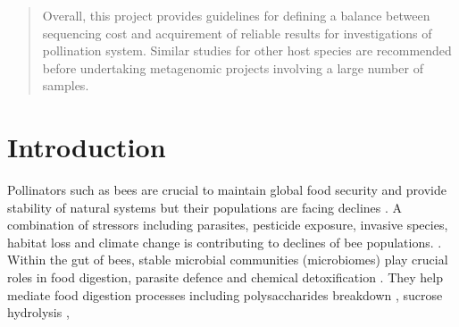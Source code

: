 \documentclass[11pt]{article}
\begin{document}
\begin{abstract}
    Overall, this project provides guidelines for defining a balance between sequencing cost and acquirement of reliable results for investigations of pollination system. 
    Similar studies for other host species are recommended before undertaking metagenomic projects involving a large number of samples.
  \end{abstract}

  \section{Introduction}
  Pollinators such as bees are crucial to maintain global food security and provide stability of natural systems \citep{hristov2020significance,bansch2021crop,khalifa2021overview} but their populations are facing declines \citep{brown2009conservation,hristov2020factors,cheng2021ecology,zattara2021worldwide}. 
  A combination of stressors including parasites, pesticide exposure, invasive species, habitat loss and climate change is contributing to declines of bee populations. \citep{brown2009conservation,hristov2020factors,cheng2021ecology,zattara2021worldwide}.
  \newline
  Within the gut of bees, stable microbial communities (microbiomes) play crucial roles in food digestion, parasite defence and chemical detoxification \citep{moran2015genomics,engel2016bee,raymann2018role}. 
  They help mediate food digestion processes including 
  polysaccharides breakdown \citep{zheng2019division}, sucrose hydrolysis \citep{engel2012functional,lee2015saccharide}, 
\end{document}
